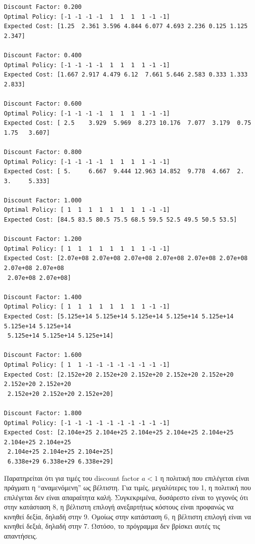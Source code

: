 \documentclass{article}
\newcommand{\eng}[1]{\foreignlanguage{english}{#1}} %
\begin{document}
\begin{verbatim}
Discount Factor: 0.200
Optimal Policy: [-1 -1 -1 -1  1  1  1  1 -1 -1]
Expected Cost: [1.25  2.361 3.596 4.844 6.077 4.693 2.236 0.125 1.125 2.347]

Discount Factor: 0.400
Optimal Policy: [-1 -1 -1 -1  1  1  1  1 -1 -1]
Expected Cost: [1.667 2.917 4.479 6.12  7.661 5.646 2.583 0.333 1.333 2.833]

Discount Factor: 0.600
Optimal Policy: [-1 -1 -1 -1  1  1  1  1 -1 -1]
Expected Cost: [ 2.5    3.929  5.969  8.273 10.176  7.077  3.179  0.75   1.75   3.607]

Discount Factor: 0.800
Optimal Policy: [-1 -1 -1 -1  1  1  1  1 -1 -1]
Expected Cost: [ 5.     6.667  9.444 12.963 14.852  9.778  4.667  2.     3.     5.333]

Discount Factor: 1.000
Optimal Policy: [ 1  1  1  1  1  1  1  1 -1 -1]
Expected Cost: [84.5 83.5 80.5 75.5 68.5 59.5 52.5 49.5 50.5 53.5]

Discount Factor: 1.200
Optimal Policy: [ 1  1  1  1  1  1  1  1 -1 -1]
Expected Cost: [2.07e+08 2.07e+08 2.07e+08 2.07e+08 2.07e+08 2.07e+08 2.07e+08 2.07e+08
 2.07e+08 2.07e+08]

Discount Factor: 1.400
Optimal Policy: [ 1  1  1  1  1  1  1  1 -1 -1]
Expected Cost: [5.125e+14 5.125e+14 5.125e+14 5.125e+14 5.125e+14 5.125e+14 5.125e+14
 5.125e+14 5.125e+14 5.125e+14]

Discount Factor: 1.600
Optimal Policy: [ 1  1 -1 -1 -1 -1 -1 -1 -1 -1]
Expected Cost: [2.152e+20 2.152e+20 2.152e+20 2.152e+20 2.152e+20 2.152e+20 2.152e+20
 2.152e+20 2.152e+20 2.152e+20]

Discount Factor: 1.800
Optimal Policy: [-1 -1 -1 -1 -1 -1 -1 -1 -1 -1]
Expected Cost: [2.104e+25 2.104e+25 2.104e+25 2.104e+25 2.104e+25 2.104e+25 2.104e+25
 2.104e+25 2.104e+25 2.104e+25]
 6.338e+29 6.338e+29 6.338e+29]
\end{verbatim}

Παρατηρείται ότι για τιμές του \eng{discount factor} $a < 1$ η πολιτική
που επιλέγεται είναι πράγματι η ``αναμενόμενη'' ως βέλτιστη. Για τιμές,
μεγαλύτερες του 1, η πολιτική που επιλέγεται δεν είναι απαραίτητα καλή.
Συγκεκριμένα, δυσάρεστο είναι το γεγονός ότι στην κατάσταση 8, η βέλτιστη
επιλογή ανεξαρτήτως κόστους είναι προφανώς να κινηθεί δεξία, δηλαδή στην 9.
Ομοίως στην κατάσταση 6, η βέλτιστη επιλογή είναι να κινηθεί δεξιά, δηλαδή
στην 7. Ωστόσο, το πρόγραμμα δεν βρίσκει αυτές τις απαντήσεις.
\end{document}
